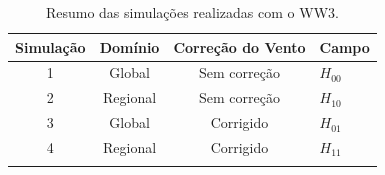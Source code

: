 \begin{table}[H]
\centering
\begin{longtable}{cccl}
\caption[Simulações realizadas]{Resumo das simulações realizadas com o WW3.}\\
\hline
\textbf{Simulação} & \textbf{Domínio} & \textbf{Correção do Vento} & \textbf{Campo} \\ \hline
1                  & Global           & Sem correção               & $H_{00}$         \\
2                  & Regional         & Sem correção               & $H_{10}$         \\
3                  & Global           & Corrigido                  & $H_{01}$         \\
4                  & Regional         & Corrigido                  & $H_{11}$         \\ \hline
\label{tab:simulacoes}
\end{longtable}
\end{table}